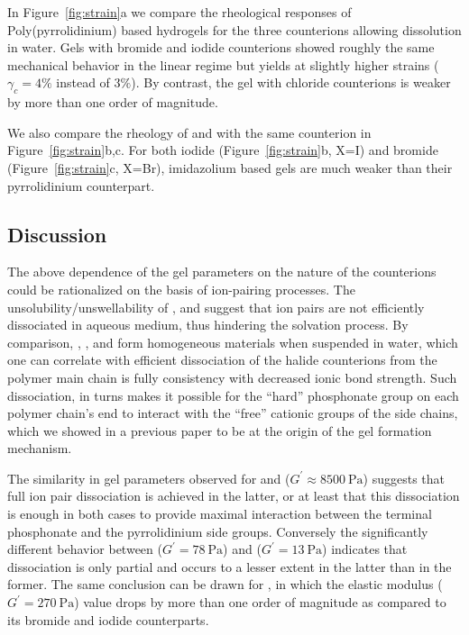 \documentclass[journal=jacsat,manuscript=article]{achemso}
\begin{document}
In Figure~\ref{fig:strain}a we compare the rheological responses of Poly(pyrrolidinium) based hydrogels for the three counterions allowing dissolution in water. Gels with bromide and iodide counterions showed roughly the same mechanical behavior in the linear regime but  yields at slightly higher strains ($\gamma_c=4\%$ instead of $3\%$). By contrast, the gel with chloride counterions is weaker by more than one order of magnitude.

We also compare the rheology of  and  with the same counterion  in Figure~\ref{fig:strain}b,c. For both iodide (Figure~\ref{fig:strain}b, X=I) and bromide (Figure~\ref{fig:strain}c, X=Br), imidazolium based gels are much weaker than their pyrrolidinium counterpart.



\subsection{Discussion}

The above dependence of the gel parameters on the nature of the counterions could be rationalized on the basis of ion-pairing processes. The unsolubility/unswellability of ,  and  suggest that ion pairs are not efficiently dissociated in aqueous medium, thus hindering the solvation process. By comparison, , ,  and  form homogeneous materials when suspended in water, which one can correlate with efficient dissociation of the halide counterions from the polymer main chain is fully consistency with decreased ionic bond strength. Such dissociation, in turns makes it possible for the ``hard'' phosphonate group on each polymer chain's end to interact with the ``free'' cationic groups of the side chains, which we showed in a previous paper to be at the origin of the gel formation mechanism\cite{Srour2014}.

The similarity in gel parameters observed for  and  ($G^\prime\approx\SI{8500}{\pascal}$) suggests that full ion pair dissociation is achieved in the latter, or at least that this dissociation is enough in both cases to provide maximal interaction between the terminal phosphonate and the pyrrolidinium side groups. Conversely the significantly different behavior between  ($G^\prime= \SI{78}{\pascal}$) and  ($G^\prime= \SI{13}{\pascal}$) indicates that dissociation is only partial and occurs to a lesser extent in the latter than in the former. The same conclusion can be drawn for , in which the elastic modulus ($G^\prime= \SI{270}{\pascal}$) value drops by more than one order of magnitude as compared to its bromide and iodide counterparts.
\end{document}
